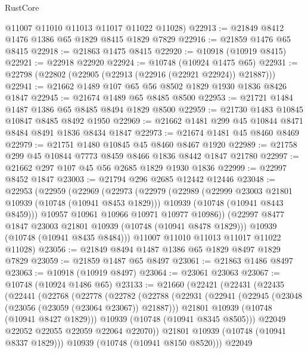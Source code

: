 \begin{lexlean}{RustCore}
\begin{coremodule}
      @11007
      @11010
      @11013
      @11017
      @11022
      @11028)
@22913 := @21849 @8412 @1476 @1386 @65 @1829 @8415 @1829 @7829
@22916 := @21859 @1476 @65 @8415
@22918 := @21863 @1475 @8415
@22920 := @10918 (@10919 @8415)
@22921 := @22918 @22920
@22924 := @10748 (@10924 @1475 @65)
@22931 := @22798 (@22802 (@22905 (@22913 (@22916 (@22921 @22924)) @21887)))
@22941 := @21662 @1489 @107 @65 @56 @8502 @1829 @1930 @1836 @8426 @1847
@22945 := @21674 @1489 @65 @8485 @8500
@22953 := @21721 @1484 @1487 @1386 @65 @8485 @8494 @1829 @8500
@22959 := @21730 @1483 @10845 @10847 @8485 @8492 @1950
@22969 := @21662 @1481 @299 @45 @10844 @8471 @8484 @8491 @1836 @8434 @1847
@22973 := @21674 @1481 @45 @8460 @8469
@22979 := @21751 @1480 @10845 @45 @8460 @8467 @1920
@22989 := @21758 @299 @45 @10844 @7773 @8459 @8466 @1836 @8442 @1847 @21780
@22997 := @21662 @297 @107 @45 @56 @2685 @1829 @1930 @1836
@22999 := @22997 @8452 @1847
@23003 := @21794 @296 @2685 @12442 @12446
@23048 := @22953
    (@22959
      (@22969
        (@22973
          (@22979
            (@22989
              (@22999 @23003 @21801 @10939 (@10748 (@10941 @8453 @1829)))
              @10939
              (@10748 (@10941 @8443 @8459)))
            @10957
            @10961
            @10966
            @10971
            @10977
            @10986))
        (@22997 @8477 @1847 @23003 @21801 @10939 (@10748 (@10941 @8478 @1829)))
        @10939
        (@10748 (@10941 @8435 @8484)))
      @11007
      @11010
      @11013
      @11017
      @11022
      @11028)
@23056 := @21849 @8494 @1487 @1386 @65 @1829 @8497 @1829 @7829
@23059 := @21859 @1487 @65 @8497
@23061 := @21863 @1486 @8497
@23063 := @10918 (@10919 @8497)
@23064 := @23061 @23063
@23067 := @10748 (@10924 @1486 @65)
@23133 := @21660
    (@22421
      (@22431
        (@22435
          (@22441
            (@22768
              (@22778
                (@22782
                  (@22788
                    (@22931
                      (@22941
                        (@22945 (@23048 (@23056 (@23059 (@23064 @23067)) @21887)))
                        @21801
                        @10939
                        (@10748 (@10941 @8427 @1829)))
                      @10939
                      (@10748 (@10941 @8345 @8505)))
                    @22049
                    @22052
                    @22055
                    @22059
                    @22064
                    @22070))
                @21801
                @10939
                (@10748 (@10941 @8337 @1829)))
              @10939
              (@10748 (@10941 @8150 @8520)))
            @22049

\end{coremodule}
\end{lexlean}
